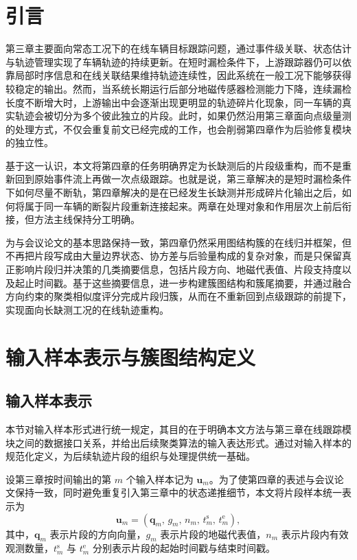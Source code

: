 \documentclass{xdupgthesis}
\begin{document}
\graphicspath{
	{code/chapter4/experiment123/chapter4_results/exp1/}
	{code/chapter4/experiment123/chapter4_results/exp2/}
	{code/chapter4/experiment123/chapter4_results/exp3/}
}

\section{引言}

第三章主要面向常态工况下的在线车辆目标跟踪问题，通过事件级关联、状态估计与轨迹管理实现了车辆轨迹的持续更新。在短时漏检条件下，上游跟踪器仍可以依靠局部时序信息和在线关联结果维持轨迹连续性，因此系统在一般工况下能够获得较稳定的输出。然而，当系统长期运行后部分地磁传感器检测能力下降，连续漏检长度不断增大时，上游输出中会逐渐出现更明显的轨迹碎片化现象，同一车辆的真实轨迹会被切分为多个彼此独立的片段。此时，如果仍然沿用第三章面向点级量测的处理方式，不仅会重复前文已经完成的工作，也会削弱第四章作为后验修复模块的独立性。

基于这一认识，本文将第四章的任务明确界定为长缺测后的片段级重构，而不是重新回到原始事件流上再做一次点级跟踪。也就是说，第三章解决的是短时漏检条件下如何尽量不断轨，第四章解决的是在已经发生长缺测并形成碎片化输出之后，如何将属于同一车辆的断裂片段重新连接起来。两章在处理对象和作用层次上前后衔接，但方法主线保持分工明确。

为与会议论文的基本思路保持一致，第四章仍然采用图结构簇的在线归并框架，但不再把片段写成由大量边界状态、协方差与后验量构成的复杂对象，而是只保留真正影响片段归并决策的几类摘要信息，包括片段方向、地磁代表值、片段支持度以及起止时间戳。基于这些摘要信息，进一步构建簇图结构和簇尾摘要，并通过融合方向约束的聚类相似度评分完成片段归簇，从而在不重新回到点级跟踪的前提下，实现面向长缺测工况的在线轨迹重构。

\section{输入样本表示与簇图结构定义}

\subsection{输入样本表示}
本节对输入样本形式进行统一规定，其目的在于明确本文方法与第三章在线跟踪模块之间的数据接口关系，并给出后续聚类算法的输入表达形式。通过对输入样本的规范化定义，为后续轨迹片段的组织与处理提供统一基础。

设第三章按时间输出的第 $m$ 个输入样本记为 $\mathbf{u}_m$。为了使第四章的表述与会议论文保持一致，同时避免重复引入第三章中的状态递推细节，本文将片段样本统一表示为
\begin{equation}
	\mathbf{u}_m=
	\left(
	\mathbf{q}_m,\,
	g_m,\,
	n_m,\,
	t_m^{\mathrm{s}},\,
	t_m^{\mathrm{e}}
	\right),
\end{equation}
其中，$\mathbf{q}_m$ 表示片段的方向向量，$g_m$ 表示片段的地磁代表值，$n_m$ 表示片段内有效观测数量，$t_m^{\mathrm{s}}$ 与 $t_m^{\mathrm{e}}$ 分别表示片段的起始时间戳与结束时间戳。
\end{document}
